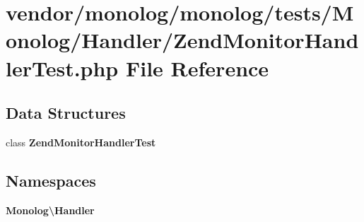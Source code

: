 \section{vendor/monolog/monolog/tests/\+Monolog/\+Handler/\+Zend\+Monitor\+Handler\+Test.php File Reference}
\label{_zend_monitor_handler_test_8php}
\subsection*{Data Structures}
\begin{DoxyCompactItemize}
\item 
class {\bf Zend\+Monitor\+Handler\+Test}
\end{DoxyCompactItemize}
\subsection*{Namespaces}
\begin{DoxyCompactItemize}
\item 
 {\bf Monolog\textbackslash{}\+Handler}
\end{DoxyCompactItemize}
